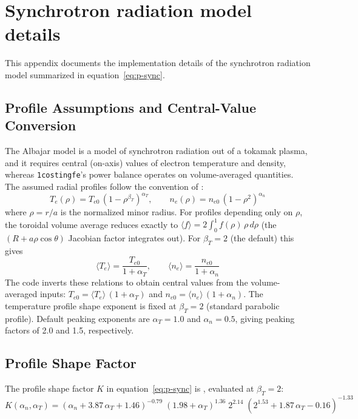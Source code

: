 \documentclass{article}
\begin{document}
\section{Synchrotron radiation model details}
\label{app:synchrotron}

This appendix documents the implementation details of the synchrotron
radiation model summarized in equation~\eqref{eq:p-sync}.

\subsection{Profile Assumptions and Central-Value Conversion}

The Albajar model is a model of synchrotron radiation out of a tokamak
plasma, and it requires central (on-axis) values of electron
temperature and density, whereas \texttt{1costingfe}'s power balance
operates on volume-averaged quantities. The assumed radial profiles
follow the convention of \citet{albajar2001}:
%
\begin{equation}
\label{eq:profile-Te}
T_e(\rho) = T_{e0}\,(1 - \rho^{\beta_T})^{\alpha_T}, \qquad
n_e(\rho) = n_{e0}\,(1 - \rho^{2})^{\alpha_n}
\end{equation}
%
where $\rho = r/a$ is the normalized minor radius. For profiles
depending only on $\rho$, the toroidal volume average reduces exactly
to $\langle f \rangle = 2\int_0^1 f(\rho)\,\rho\,d\rho$ (the
$(R + a\rho\cos\theta)$ Jacobian factor integrates out). For
$\beta_T = 2$ (the default) this gives
%
\begin{equation}
\label{eq:peaking}
\langle T_e \rangle = \frac{T_{e0}}{1 + \alpha_T}, \qquad
\langle n_e \rangle = \frac{n_{e0}}{1 + \alpha_n}
\end{equation}
%
The code inverts these relations to obtain central values from the
volume-averaged inputs: $T_{e0} = \langle T_e \rangle\,(1+\alpha_T)$
and $n_{e0} = \langle n_e \rangle\,(1+\alpha_n)$. The temperature
profile shape exponent is fixed at $\beta_T = 2$ (standard parabolic
profile). Default peaking exponents are $\alpha_T = 1.0$ and
$\alpha_n = 0.5$, giving peaking factors of 2.0 and 1.5, respectively.

\subsection{Profile Shape Factor}

The profile shape factor $K$ in equation~\eqref{eq:p-sync} is
\citep{albajar2001}, evaluated at $\beta_T = 2$:
%
\begin{equation}
\label{eq:K-factor}
K(\alpha_n, \alpha_T) =
  (\alpha_n + 3.87\,\alpha_T + 1.46)^{-0.79}\;
  (1.98 + \alpha_T)^{1.36}\;
  2^{2.14}\;
  (2^{1.53} + 1.87\,\alpha_T - 0.16)^{-1.33}
\end{equation}
\end{document}
